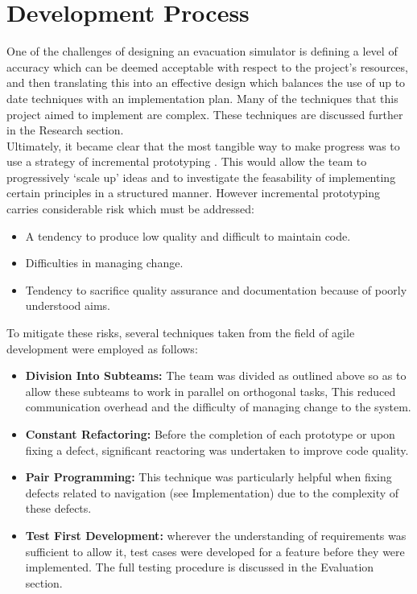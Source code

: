 \section{Development Process}
\label{Team:subsec:process}
One of the challenges of designing an evacuation simulator is defining a level of accuracy which can be deemed acceptable with respect to the project's resources, and then translating this into an effective design which balances the use of up to date techniques with an implementation plan. Many of the techniques that this project aimed to implement are complex. These techniques are discussed further in the Research section.\\
Ultimately, it became clear that the most tangible way to make progress was to use a strategy of incremental prototyping \cite[Ch 2.3.2]{SommervilleSoftwareEng}. This would allow the team to progressively `scale up' ideas and to investigate the feasability of implementing certain principles in a structured manner. However incremental prototyping carries considerable risk which must be addressed:
\begin{itemize}
\item A tendency to produce low quality and difficult to maintain code.
\item Difficulties in managing change.
\item Tendency to sacrifice quality assurance and documentation because of poorly understood aims.
\end{itemize}

To mitigate these risks, several techniques taken from the field of agile development \cite[Ch. 3]{SommervilleSoftwareEng} were employed as follows:
\begin{itemize}
\item \textbf{Division Into Subteams:} The team was divided as outlined above so as to allow these subteams to work in parallel on orthogonal tasks, This reduced communication overhead and the difficulty of managing change to the system.
\item \textbf{Constant Refactoring:} Before the completion of each prototype or upon fixing a defect, significant reactoring was undertaken to improve code quality.
\item \textbf{Pair Programming:} This technique was particularly helpful when fixing defects related to navigation (see Implementation) due to the complexity of these defects.
\item \textbf{Test First Development:} wherever the understanding of requirements was sufficient to allow it, test cases were developed for a feature before they were implemented. The full testing procedure is discussed in the Evaluation section.
\end{itemize}

%
